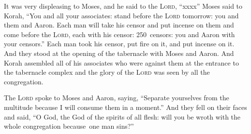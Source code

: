 \begin{inparaenum}
     It was very displeasing to Moses, and he said to the \textsc{Lord}, ``xxxx''%
     Moses said to Korah, ``You and all your associates: stand before the \textsc{Lord} tomorrow: you and them and Aaron.%
     Each man will take his censor and put incense on them and come before the \textsc{Lord}, each with his censor: 250~censors: you and Aaron with your censors.''%
     Each man took his censor, put fire on it, and put incense on it. And they stood at the opening of the tabernacle with Moses and Aaron.%
     And Korah assembled all of his associates who were against them at the entrance to the tabernacle complex and the glory of the \textsc{Lord} was seen by all the congregation.%
    
     The \textsc{Lord} spoke to Moses and Aaron, saying,%
     ``Separate yourselves from the multitude because I will consume them in a moment.''%
     And they fell on their faces and said, ``O God, the God of the spirits of all flesh: will you be wroth with the whole congregation because\understood\ one man sins?''%
    

\end{inparaenum}

